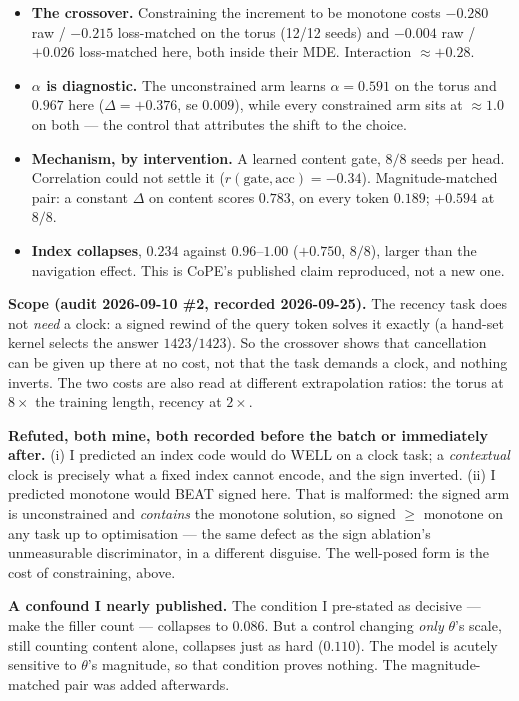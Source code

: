 \documentclass[11pt]{article}
\begin{document}
\begin{itemize}\itemsep2pt
\item \textbf{The crossover.} Constraining the increment to be monotone costs
  $-0.280$ raw / $-0.215$ loss-matched on the torus (12/12 seeds) and $-0.004$ raw
  / $+0.026$ loss-matched here, both inside their MDE. Interaction $\approx +0.28$.
\item \textbf{$\alpha$ is diagnostic.} The unconstrained arm learns
  $\alpha = 0.591$ on the torus and $0.967$ here ($\Delta = +0.376$, se $0.009$),
  while every constrained arm sits at $\approx 1.0$ on both --- the control that
  attributes the shift to the choice.
\item \textbf{Mechanism, by intervention.} A learned content gate, $8/8$ seeds per
  head. Correlation could not settle it ($r(\text{gate},\text{acc}) = -0.34$).
  Magnitude-matched pair: a constant $\Delta$ on content scores $0.783$, on every
  token $0.189$; $+0.594$ at $8/8$.
\item \textbf{Index collapses}, $0.234$ against $0.96$--$1.00$ ($+0.750$, $8/8$),
  larger than the navigation effect. This is CoPE's published claim reproduced, not
  a new one.
\end{itemize}

\textbf{Scope (audit 2026-09-10 \#2, recorded 2026-09-25).} The recency task does not
\emph{need} a clock: a signed rewind of the query token solves it exactly (a hand-set
kernel selects the answer $1423/1423$). So the crossover shows that cancellation can
be given up there at no cost, not that the task demands a clock, and nothing
inverts. The two costs are also read at different extrapolation ratios: the torus at
$8\times$ the training length, recency at $2\times$.

\textbf{Refuted, both mine, both recorded before the batch or immediately after.}
(i) I predicted an index code would do WELL on a clock task; a \emph{contextual}
clock is precisely what a fixed index cannot encode, and the sign inverted.
(ii) I predicted monotone would BEAT signed here. That is malformed: the signed arm
is unconstrained and \emph{contains} the monotone solution, so signed $\ge$
monotone on any task up to optimisation --- the same defect as the sign ablation's
unmeasurable discriminator, in a different disguise. The well-posed form is the
cost of constraining, above.

\textbf{A confound I nearly published.} The condition I pre-stated as decisive ---
make the filler count --- collapses to $0.086$. But a control changing \emph{only}
$\theta$'s scale, still counting content alone, collapses just as hard ($0.110$).
The model is acutely sensitive to $\theta$'s magnitude, so that condition proves
nothing. The magnitude-matched pair was added afterwards.
\end{document}
